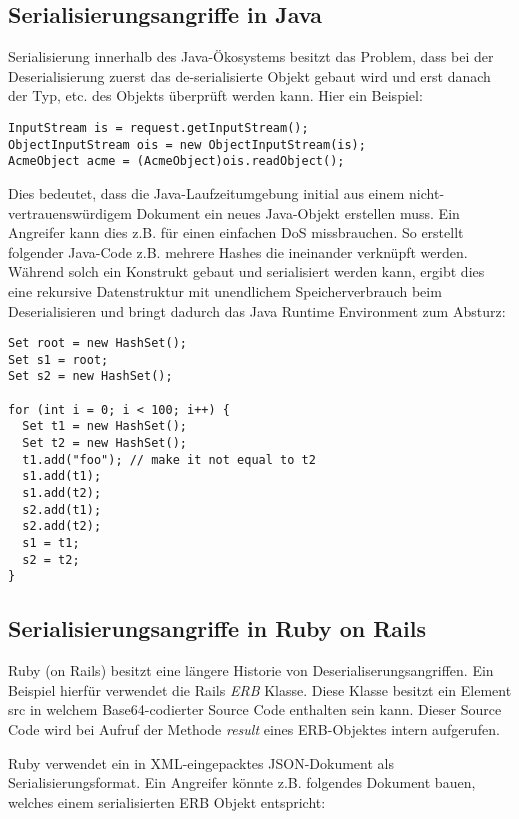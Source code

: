 \subsection{Serialisierungsangriffe in Java}

Serialisierung innerhalb des Java-Ökosystems besitzt das Problem, dass bei der Deserialisierung zuerst das de-serialisierte Objekt gebaut wird und erst danach der Typ, etc. des Objekts überprüft werden kann. Hier ein Beispiel:

\begin{verbatim}
InputStream is = request.getInputStream();
ObjectInputStream ois = new ObjectInputStream(is);
AcmeObject acme = (AcmeObject)ois.readObject();
\end{verbatim}

Dies bedeutet, dass die Java-Laufzeitumgebung initial aus einem nicht-vertrauenswürdigem Dokument ein neues Java-Objekt erstellen muss. Ein Angreifer kann dies z.B. für einen einfachen DoS missbrauchen. So erstellt folgender Java-Code z.B. mehrere Hashes die ineinander verknüpft werden. Während solch ein Konstrukt gebaut und serialisiert werden kann, ergibt dies eine rekursive Datenstruktur mit unendlichem Speicherverbrauch beim Deserialisieren und bringt dadurch das Java Runtime Environment zum Absturz:

\begin{verbatim}
Set root = new HashSet();
Set s1 = root;
Set s2 = new HashSet();

for (int i = 0; i < 100; i++) {
  Set t1 = new HashSet();
  Set t2 = new HashSet();
  t1.add("foo"); // make it not equal to t2
  s1.add(t1);
  s1.add(t2);
  s2.add(t1);
  s2.add(t2);
  s1 = t1;
  s2 = t2;
}
\end{verbatim}

\subsection{Serialisierungsangriffe in Ruby on Rails}

Ruby (on Rails) besitzt eine längere Historie von Deserialiserungsangriffen. Ein Beispiel hierfür verwendet die Rails \textit{ERB} Klasse. Diese Klasse besitzt ein Element src in welchem Base64-codierter Source Code enthalten sein kann. Dieser Source Code wird bei Aufruf der Methode \textit{result} eines ERB-Objektes intern aufgerufen.

Ruby verwendet ein in XML-eingepacktes JSON-Dokument als Serialisierungsformat. Ein Angreifer könnte z.B. folgendes Dokument bauen, welches einem serialisierten ERB Objekt entspricht:

